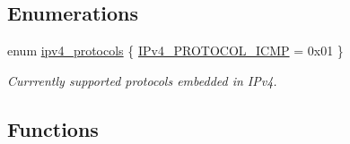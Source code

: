 \subsection*{Enumerations}
\begin{DoxyCompactItemize}
\item 
enum \mbox{\hyperlink{group__ipv4_gacbfe55abe1d01bf1da8b66868f8135aa}{ipv4\+\_\+protocols}} \{ \mbox{\hyperlink{group__ipv4_ggacbfe55abe1d01bf1da8b66868f8135aaa9190ff825ad5c7929c62ed0ce199fc19}{I\+Pv4\+\_\+\+P\+R\+O\+T\+O\+C\+O\+L\+\_\+\+I\+C\+MP}} = 0x01
 \}
\begin{DoxyCompactList}\small\item\em Currrently supported protocols embedded in I\+Pv4. \end{DoxyCompactList}\end{DoxyCompactItemize}
\subsection*{Functions}
